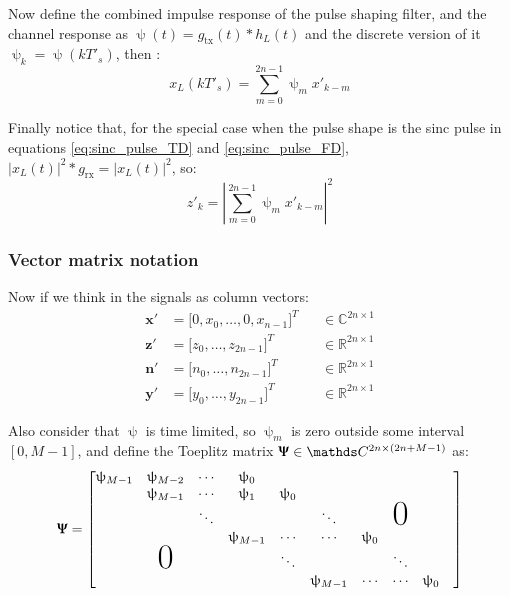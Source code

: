 Now define the combined impulse response of the pulse shaping filter, and the channel response as $\uppsi(t)=g_\text{tx}(t)*h_L(t)$ and the discrete version of it $\uppsi_k=\uppsi(kT'_s)$, then \cite{Plabst_DD}:
\begin{equation}
x_L(kT'_s)=\sum_{m=0}^{2n-1}\uppsi_mx'_{k-m}
\end{equation}

Finally notice that, for the special case when the pulse shape is the sinc pulse in equations \ref{eq:sinc_pulse_TD} and \ref{eq:sinc_pulse_FD}, $|x_L(t)|^2*g_\text{rx}=|x_L(t)|^2$, so:
\begin{equation}
z'_k=\left|\sum_{m=0}^{2n-1}\uppsi_mx'_{k-m}\right|^2
\end{equation}


\subsubsection{Vector matrix notation}

Now if we think in the signals as column vectors:
\begin{align*}
	\bm x'&=\bigl[0,x_0,\dotsc,0,x_{n-1}\bigr]^T &&\in\mathds C^{2n\times1}\\
	\bm z'&=\bigl[z_0,\dotsc,z_{2n-1}\bigr]^T &&\in\mathds R^{2n\times1}\\
	\bm n'&=\bigl[n_0,\dotsc,n_{2n-1}\bigr]^T &&\in\mathds R^{2n\times1}\\
	\bm y'&=\bigl[y_0,\dotsc,y_{2n-1}\bigr]^T &&\in\mathds R^{2n\times1}
\end{align*}

Also consider that $\uppsi$ is time limited, so $\uppsi_m$ is zero outside some interval $[0,M-1]$, and define the Toeplitz matrix
$\bm \Uppsi \in\mathds C^{2n\times(2n+M-1)}$ as:
\begin{equation}
	\bm \Uppsi = \begin{bmatrix}
				\uppsi_{M-1}&\uppsi_{M-2}&\cdots &\uppsi_0&&&\\
				&\uppsi_{M-1}&\cdots &\uppsi_1&\uppsi_0&&\\
				&&\ddots&&&\ddots&&\mbox{\Huge 0}&\\
				&&&\uppsi_{M-1}&\cdots&\cdots&\uppsi_0&\\
				&\mbox{\Huge 0}&&&\ddots&&&\ddots&&\\
				&&&&&\uppsi_{M-1}&\cdots&\cdots&\uppsi_0&\\
			     \end{bmatrix}
\end{equation}

